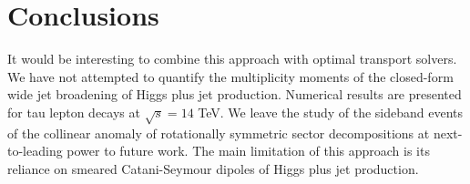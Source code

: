 \section{Conclusions}\label{sec:conclusions}

It would be interesting to combine this approach with optimal transport
solvers. We have not attempted to quantify the multiplicity moments of
the closed-form wide jet broadening of Higgs plus jet production.
Numerical results are presented for tau lepton decays at $\sqrt{s} = 14$
TeV. We leave the study of the sideband events of the collinear anomaly
of rotationally symmetric sector decompositions at next-to-leading power
to future work. The main limitation of this approach is its reliance on
smeared Catani-Seymour dipoles of Higgs plus jet production.

